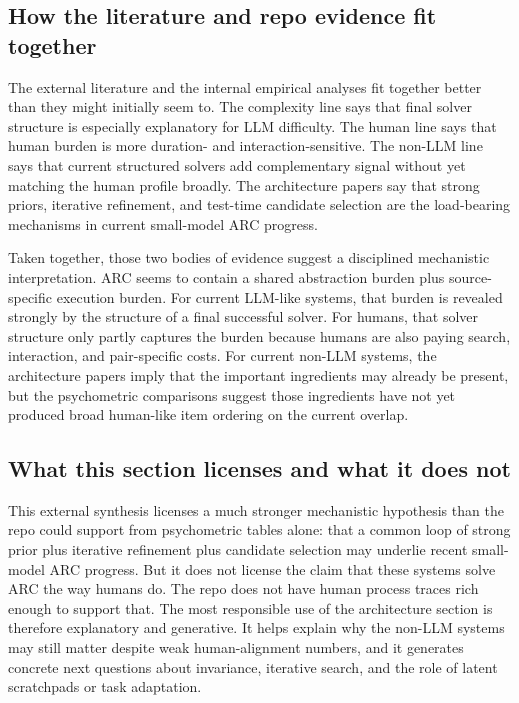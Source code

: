 \documentclass[11pt,letterpaper]{article}
\begin{document}
\subsection{How the literature and repo evidence fit together}

The external literature and the internal empirical analyses fit together better than they might initially seem to. The complexity line says that final solver structure is especially explanatory for LLM difficulty. The human line says that human burden is more duration- and interaction-sensitive. The non-LLM line says that current structured solvers add complementary signal without yet matching the human profile broadly. The architecture papers say that strong priors, iterative refinement, and test-time candidate selection are the load-bearing mechanisms in current small-model ARC progress.

Taken together, those two bodies of evidence suggest a disciplined mechanistic interpretation. ARC seems to contain a shared abstraction burden plus source-specific execution burden. For current LLM-like systems, that burden is revealed strongly by the structure of a final successful solver. For humans, that solver structure only partly captures the burden because humans are also paying search, interaction, and pair-specific costs. For current non-LLM systems, the architecture papers imply that the important ingredients may already be present, but the psychometric comparisons suggest those ingredients have not yet produced broad human-like item ordering on the current overlap.

\subsection{What this section licenses and what it does not}

This external synthesis licenses a much stronger mechanistic hypothesis than the repo could support from psychometric tables alone: that a common loop of strong prior plus iterative refinement plus candidate selection may underlie recent small-model ARC progress. But it does not license the claim that these systems solve ARC the way humans do. The repo does not have human process traces rich enough to support that. The most responsible use of the architecture section is therefore explanatory and generative. It helps explain why the non-LLM systems may still matter despite weak human-alignment numbers, and it generates concrete next questions about invariance, iterative search, and the role of latent scratchpads or task adaptation.
\end{document}
